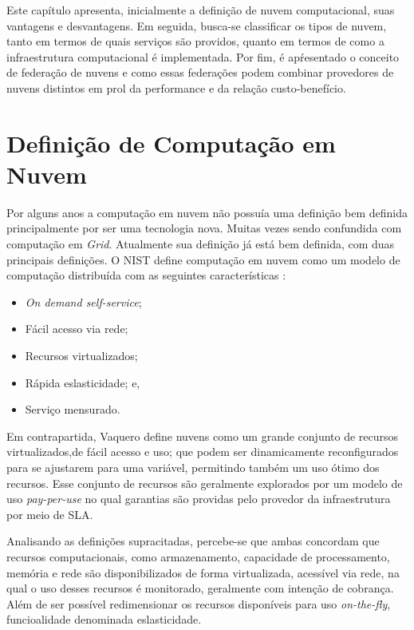 Este capítulo apresenta, inicialmente a definição de nuvem computacional, suas vantagens e desvantagens. Em seguida, busca-se classificar os tipos de nuvem, tanto em termos de quais serviços são providos, quanto em termos de como a infraestrutura computacional é implementada. Por fim, é apŕesentado o conceito de federação de nuvens e como essas federações podem combinar provedores de nuvens distintos em prol da performance e da relação custo-benefício.

\section{Definição de Computação em Nuvem}

Por alguns anos a computação em nuvem não possuía uma definição bem definida principalmente por ser uma tecnologia nova. Muitas vezes sendo confundida com computação em \textit{Grid}. Atualmente sua definição já está bem definida, com duas principais definições. O \acrfull{NIST} define computação em nuvem como um modelo de computação distribuída com as seguintes características \cite{NIST_CLOUD_DEFINITION}: 
\begin{itemize}
	\item \textit{On demand self-service};
	\item Fácil acesso via rede;
	\item Recursos virtualizados;
	\item Rápida eslasticidade; e,
	\item Serviço mensurado.
\end{itemize}

Em contrapartida, Vaquero\cite{Vaquero:2008:BCT:1496091.1496100_Cloud_definition} define nuvens como um grande conjunto de recursos virtualizados,\iffalse tais como \textit{hardware},plataforma de desenvolvimentos e/ou serviços \fi de fácil acesso e uso; que podem ser dinamicamente reconfigurados para se ajustarem para uma variável, permitindo também um uso ótimo dos recursos. Esse conjunto de recursos são geralmente explorados por um modelo de uso \textit{pay-per-use} no qual garantias são providas pelo provedor da infraestrutura por meio de \acrfull{SLA}.

Analisando as definições supracitadas, percebe-se que ambas concordam que recursos computacionais, como armazenamento, capacidade de processamento, memória e rede são disponibilizados de forma virtualizada, acessível via rede, na qual o uso desses recursos é monitorado, geralmente com intenção de cobrança. Além de ser possível redimensionar os recursos disponíveis para uso \textit{on-the-fly}, funcioalidade denominada eslasticidade.

